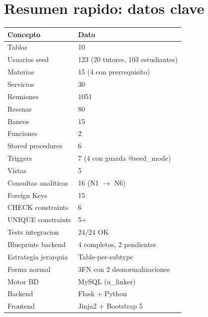 \documentclass[10pt,a4paper]{article}
\begin{document}
\section{Resumen rapido: datos clave}
\begin{center}
\begin{tabular}{ll}
\toprule
\textbf{Concepto} & \textbf{Dato} \\
\midrule
Tablas & 10 \\
Usuarios seed & 123 (20 tutores, 103 estudiantes) \\
Materias & 15 (4 con prerrequisito) \\
Servicios & 30 \\
Reuniones & 1051 \\
Resenas & 80 \\
Baneos & 15 \\
Funciones & 2 \\
Stored procedures & 6 \\
Triggers & 7 (4 con guarda @seed\_mode) \\
Vistas & 5 \\
Consultas analiticas & 16 (N1 $\rightarrow$ N6) \\
Foreign Keys & 15 \\
CHECK constraints & 6 \\
UNIQUE constraints & 5+ \\
Tests integracion & 24/24 OK \\
Blueprints backend & 4 completos, 2 pendientes \\
Estrategia jerarquia & Table-per-subtype \\
Forma normal & 3FN con 2 desnormalizaciones \\
Motor BD & MySQL (u\_linker) \\
Backend & Flask + Python \\
Frontend & Jinja2 + Bootstrap 5 \\
\bottomrule
\end{tabular}
\end{center}
\end{document}
